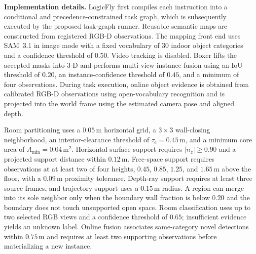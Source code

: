 \documentclass[letterpaper,10pt,journal]{IEEEtran}
\begin{document}
\textbf{Implementation details.}
LogicFly first compiles each instruction into a conditional and precedence-constrained task graph, which is subsequently executed by the proposed task-graph runner. Reusable semantic maps are constructed from registered RGB-D observations. The mapping front end uses SAM~3.1 in image mode with a fixed vocabulary of 30 indoor object categories and a confidence threshold of $0.50$. Video tracking is disabled. Boxer lifts the accepted masks into 3-D and performs multi-view instance fusion using an IoU threshold of $0.20$, an instance-confidence threshold of $0.45$, and a minimum of four observations. During task execution, online object evidence is obtained from calibrated RGB-D observations using open-vocabulary recognition and is projected into the world frame using the estimated camera pose and aligned depth.

Room partitioning uses a $0.05\,\mathrm{m}$ horizontal grid, a $3\times3$ wall-closing neighborhood, an interior-clearance threshold of $\tau_c=0.45\,\mathrm{m}$, and a minimum core area of $A_{\min}=0.04\,\mathrm{m}^2$. Horizontal-surface support requires $|n_z|\geq0.90$ and a projected support distance within $0.12\,\mathrm{m}$. Free-space support requires observations at at least two of four heights, $0.45$, $0.85$, $1.25$, and $1.65\,\mathrm{m}$ above the floor, with a $0.09\,\mathrm{m}$ proximity tolerance. Depth-ray support requires at least three source frames, and trajectory support uses a $0.15\,\mathrm{m}$ radius. A region can merge into its sole neighbor only when the boundary wall fraction is below $0.20$ and the boundary does not touch unsupported open space. Room classification uses up to two selected RGB views and a confidence threshold of $0.65$; insufficient evidence yields an unknown label. Online fusion associates same-category novel detections within $0.75\,\mathrm{m}$ and requires at least two supporting observations before materializing a new instance.
\end{document}
